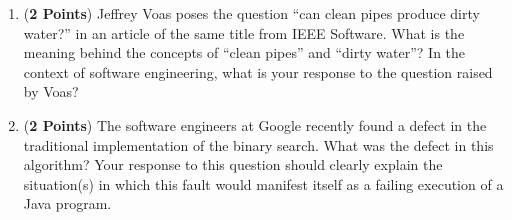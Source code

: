 \documentclass[12pt,epsf,psfig,graphics]{article}
\begin{document}
\begin{enumerate}
\begin{enumerate}
  \item ({\bf 2 Points}) Jeffrey Voas poses the question ``can clean
    pipes produce dirty water?'' in an article of the same title from
    IEEE Software.  What is the meaning behind the concepts of ``clean
    pipes'' and ``dirty water''?  In the context of software
    engineering, what is your response to the question raised by Voas?

  \item ({\bf 2 Points}) The software engineers at Google recently
    found a defect in the traditional implementation of the binary
    search.  What was the defect in this algorithm?  Your response to
    this question should clearly explain the situation(s) in which
    this fault would manifest itself as a failing execution of a Java
    program.

\end{enumerate}

\end{enumerate}
\end{document}
